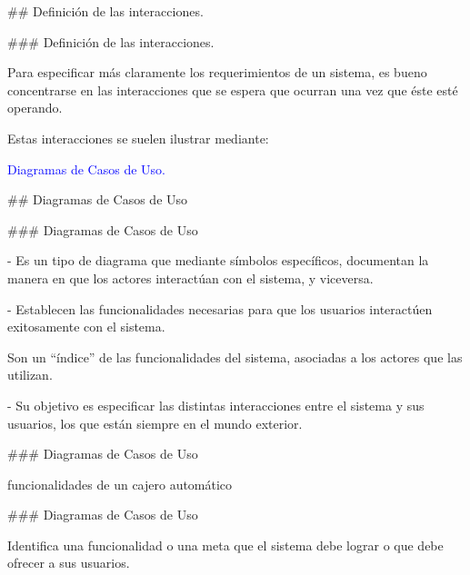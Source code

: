 ## Definición de las interacciones.

### Definición de las interacciones.

Para especificar más claramente los requerimientos de un sistema, es bueno concentrarse en
las interacciones que se espera que ocurran una vez que éste esté operando.\newline

Estas interacciones se suelen ilustrar mediante:

\begin{rboxx}{}
    \textcolor{blue}{Diagramas de Casos de Uso.}
\end{rboxx}

## Diagramas de Casos de Uso

### Diagramas de Casos de Uso

\newline

- Es un tipo de diagrama que mediante símbolos específicos, documentan la manera en que los
actores interactúan con el sistema, y viceversa.

- Establecen las funcionalidades necesarias para que los usuarios interactúen exitosamente con el sistema.

\begin{rboxx}{}
    Son un ``índice'' de las funcionalidades del sistema,
    asociadas a los actores que las utilizan.
\end{rboxx}

- Su objetivo es especificar las distintas interacciones entre el sistema y sus usuarios, los que
están siempre en el mundo exterior.

### Diagramas de Casos de Uso

 funcionalidades de un cajero automático\newline

\exA

### Diagramas de Casos de Uso

\newline

\columnsbegin


\centering{}

 Identifica una funcionalidad o una meta que el sistema debe lograr o que debe ofrecer
a sus usuarios.

